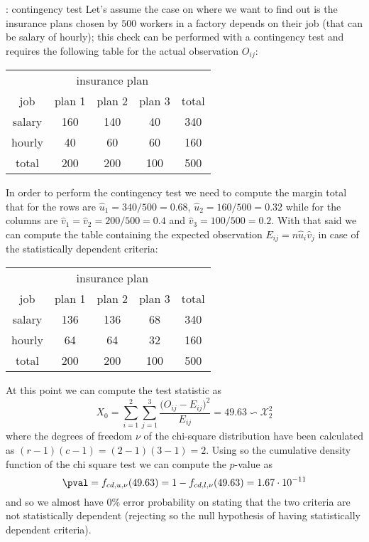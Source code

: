 	\begin{example}{: contingency test}
		Let's assume the case on where we want to find out is the insurance plans chosen by $500$ workers in a factory depends on their job (that can be salary of hourly); this check can be performed with a contingency test and requires the following table for the actual observation $O_{ij}$:
		               
		\begin{center} 
		\begin{tabular}{ c | c c c | c }
			& \multicolumn{3}{c|}{insurance plan } \\
			job & plan 1 & plan 2 & plan 3 & total \\ \hline
			salary & 160 & 140 & 40 & 340 \\
			hourly & 40 & 60 & 60 & 160 \\ \hline 
			total & 200 & 200 & 100 & 500
		\end{tabular}
		\end{center}
		
		In order to perform the contingency test we need to compute the margin total that for the rows are $\hat u_1 = 340/500 = 0.68$, $\hat u_2 = 160/500 = 0.32$ while for the columns are $\hat v_1 = \hat v_2  = 200 / 500 = 0.4$ and $\hat v_3 = 100/500 = 0.2$. With that said we can compute the table containing the expected observation $E_{ij} = n \hat u_i \hat v_j$ in case of the statistically dependent criteria:
		
		\begin{center} 
			\begin{tabular}{ c | c c c | c }
				& \multicolumn{3}{c|}{insurance plan } \\
				job & plan 1 & plan 2 & plan 3 & total \\ \hline
				salary & 136 & 136 & 68 & 340 \\
				hourly & 64 & 64 & 32 & 160 \\ \hline 
				total & 200 & 200 & 100 & 500
			\end{tabular}
		\end{center}	
		
		At this point we can compute the test statistic as
		\[ X_0 = \sum_{i=1}^2 \sum_{j=1}^3 \frac{\big(O_{ij}-E_{ij}\big)^2}{E_{ij}} = 49.63 \backsim \mathcal X^2_2 \]
		where the degrees of freedom $\nu$ of the chi-square distribution have been calculated as $(r-1)(c-1) = (2-1)(3-1) = 2$. Using so the cumulative density function of the chi square test we can compute the $p$-value as
		\[ \pval = f_{cd,u,\nu}(49.63) = 1 - f_{cd,l,\nu}(49.63) = 1.67 \cdot 10^{-11} \]
		and so we almost have $0\%$ error probability on stating that the two criteria are not statistically dependent (rejecting so the null hypothesis of having statistically dependent criteria).
		
		
	\end{example}
	
